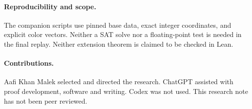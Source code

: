 \documentclass[11pt,letterpaper]{article}
\begin{document}
\paragraph{Reproducibility and scope.}
The companion scripts use pinned base data, exact integer
coordinates, and explicit color vectors. Neither a SAT solve
nor a floating-point test is needed in the final replay.
Neither extension theorem is claimed to be checked in Lean.

\paragraph{Contributions.}
Aafi Khan Malek selected and directed the research. ChatGPT assisted
with proof development, software and writing. Codex was not used.
This research note has not been peer reviewed.
\end{document}

